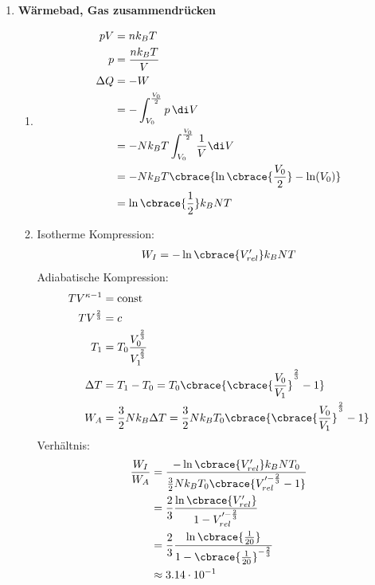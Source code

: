 \documentclass[11pt,letterpaper]{article}
\begin{document}

\begin{enumerate}
    \item \textbf{Wärmebad, Gas zusammendrücken}
        \begin{enumerate}
            \item
            \begin{align*}
                pV &= n k_B T \\
                p &= \frac{n k_B T}{V} \\
                \Delta Q &= -W\\
                &= -\int_{V_0}^\frac{V_0}{2} p \, \di V \\
                &= -N k_B T \int_{V_0}^\frac{V_0}{2}  \frac{1}{V} \di V\\
                &= -N k_B T \cbrace{\ln\cbrace{\frac{V_0}{2}} - \ln(V_0)}\\
                &= \ln\cbrace{\frac{1}{2}} k_B N T \\
            \end{align*}

            \item
            Isotherme Kompression:
            \begin{align*}
                W_{I} &= -\ln\cbrace{V_{rel}'} k_B N T \\
            \end{align*}
            Adiabatische Kompression:
            \begin{align*}
                TV^{\kappa-1} &= \text{const}\\
                TV^{\frac{2}{3}} &= c\\
                T_1 &= T_0  \frac{V_0^{\frac{2}{3}}}{V_1^{\frac{2}{3}}}\\
                \Delta T &= T_1 - T_0 = T_0 \cbrace{\cbrace{\frac{V_0}{V_1}}^{\frac{2}{3}} - 1}\\
                W_{A} &= \frac{3}{2} N k_B \Delta T = \frac{3}{2} N k_B T_0 \cbrace{\cbrace{\frac{V_0}{V_1}}^{\frac{2}{3}} - 1}\\
            \end{align*}
            Verhältnis:
            \begin{align*}
                \frac{W_I}{W_A} &= \frac{-\ln\cbrace{V_{rel}'} k_B N T_0}
                {\frac{3}{2} N k_B T_0 \cbrace{V_{rel}'^{-\frac{2}{3}} - 1}}\\
                &= \frac{2}{3} \frac{\ln\cbrace{V_{rel}'}}
                {{1 - V_{rel}'^{-\frac{2}{3}}}}\\
                &= \frac{2}{3} \frac{\ln\cbrace{\frac{1}{20}}}
                {{1 - \cbrace{\frac{1}{20}}^{-\frac{2}{3}}}}\\
                &\approx 3.14 \cdot 10^{-1}
            \end{align*}
            


\end{enumerate}
\end{enumerate}
\end{document}
